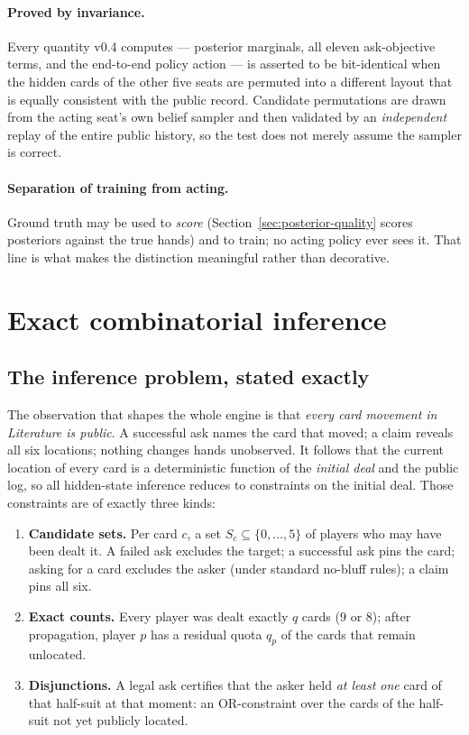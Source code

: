 \documentclass[11pt,a4paper]{article}
\begin{document}
\paragraph{Proved by invariance.} Every quantity v0.4 computes --- posterior
marginals, all eleven ask-objective terms, and the end-to-end policy action ---
is asserted to be bit-identical when the hidden cards of the other five seats
are permuted into a different layout that is equally consistent with the public
record. Candidate permutations are drawn from the acting seat's own belief
sampler and then validated by an \emph{independent} replay of the entire public
history, so the test does not merely assume the sampler is correct.

\paragraph{Separation of training from acting.} Ground truth may be used to
\emph{score} (Section~\ref{sec:posterior-quality} scores posteriors against the
true hands) and to train; no acting policy ever sees it. That line is what
makes the distinction meaningful rather than decorative.

\section{Exact combinatorial inference}
\label{sec:counting}

\subsection{The inference problem, stated exactly}

The observation that shapes the whole engine is that \emph{every card movement
in Literature is public}. A successful ask names the card that moved; a claim
reveals all six locations; nothing changes hands unobserved. It follows that
the current location of every card is a deterministic function of the
\emph{initial deal} and the public log, so all hidden-state inference reduces
to constraints on the initial deal. Those constraints are of exactly three
kinds:

\begin{enumerate}
\item \textbf{Candidate sets.} Per card $c$, a set $S_c \subseteq \{0,\dots,5\}$
of players who may have been dealt it. A failed ask excludes the target;
a successful ask pins the card; asking for a card excludes the asker (under
standard no-bluff rules); a claim pins all six.
\item \textbf{Exact counts.} Every player was dealt exactly $q$ cards ($9$ or
$8$); after propagation, player $p$ has a residual quota $q_p$ of the cards
that remain unlocated.
\item \textbf{Disjunctions.} A legal ask certifies that the asker held
\emph{at least one} card of that half-suit at that moment: an OR-constraint
over the cards of the half-suit not yet publicly located.
\end{enumerate}
\end{document}
